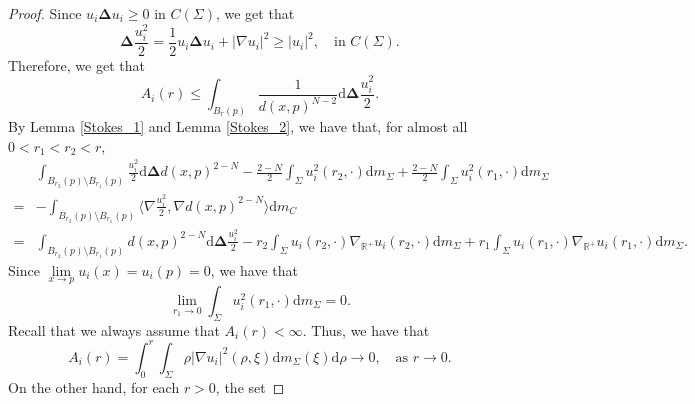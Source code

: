 \documentclass{article}
\theoremstyle{remark}
\numberwithin{equation}{section}
\theoremstyle{definition}
\begin{document}
    \begin{proof}
    	Since $u_{i}\mathbf{\Delta} u_{i} \ge 0$ in $C(\Sigma)$, we get that
    	\begin{equation}
    		\mathbf{\Delta} \frac{u_{i}^{2}}{2} = \frac{1}{2}u_{i}\mathbf{\Delta} u_{i} + \lvert \nabla u_{i} \rvert^{2} \ge \lvert u_{i} \rvert^{2},\quad \text{in } C(\Sigma).
    	\end{equation}
    	Therefore, we get that
    	\begin{equation}
    		A_{i}(r) \le \int_{B_{r}(p)} \frac{1}{d(x,p)^{N-2}} \mathrm{d}\mathbf{\Delta} \frac{u_{i}^{2}}{2}.
    	\end{equation}
    	By Lemma \ref{Stokes_1} and Lemma \ref{Stokes_2}, we have that, for almost all $0<r_{1}<r_{2}<r$,
    	\begin{equation}\label{equation_1_lemma_4_proof_of_main_theorem}
    		\begin{split}
    			& \int_{B_{r_{2}}(p)\setminus B_{r_{1}}(p)} \frac{u_{i}^{2}}{2} \mathrm{d} \mathbf{\Delta} d(x,p)^{2-N} - \frac{2-N}{2} \int_{\Sigma} u_{i}^{2}(r_{2},\cdot) \mathrm{d}m_{\Sigma} + \frac{2-N}{2} \int_{\Sigma} u_{i}^{2}(r_{1},\cdot) \mathrm{d}m_{\Sigma}\\
    			= & - \int_{B_{r_{2}}(p)\setminus B_{r_{1}}(p)} \langle \nabla \frac{u_{i}^{2}}{2},\nabla d(x,p)^{2-N} \rangle \mathrm{d}m_{C}\\
    			= & \int_{B_{r_{2}}(p) \setminus B_{r_{1}}(p)} d(x,p)^{2-N} \mathrm{d}\mathbf{\Delta} \frac{u_{i}^{2}}{2} -r_{2} \int_{\Sigma} u_{i}(r_{2},\cdot) \nabla_{\mathbb{R}^{+}} u_{i}(r_{2},\cdot) \mathrm{d}m_{\Sigma} + r_{1} \int_{\Sigma} u_{i}(r_{1},\cdot) \nabla_{\mathbb{R}^{+}} u_{i}(r_{1},\cdot) \mathrm{d}m_{\Sigma}.
    		\end{split}
    	\end{equation}
    	Since $\lim\limits_{x \to p} u_{i}(x) = u_{i}(p)=0$, we have that
    	\begin{equation}\label{equation_2_lemma_4_proof_of_main_theorem}
    		\lim\limits_{r_{1} \to 0} \int_{\Sigma} u_{i}^{2}(r_{1},\cdot) \mathrm{d}m_{\Sigma} = 0.
    	\end{equation}
    	Recall that we always assume that $A_{i}(r) < \infty$. Thus, we have that
    	\begin{equation}
    		A_{i}(r) = \int_{0}^{r} \int_{\Sigma} \rho \lvert \nabla u_{i} \rvert^{2}(\rho,\xi) \mathrm{d}m_{\Sigma}(\xi) \mathrm{d}\rho \to 0,\quad \text{as } r \to 0.
    	\end{equation}
    	On the other hand, for each $r > 0$, the set

\end{proof}
\end{document}
